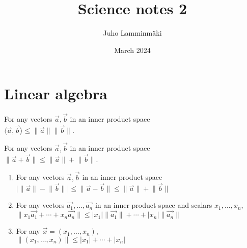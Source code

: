 \documentclass{article}
\title{Science notes 2}
\author{Juho Lamminmäki }
\date{March 2024}
\begin{document}
\maketitle

\section{Linear algebra}

\begin{theorem}
For any vectors $\vec{a}, \vec{b}$ in an inner product space \\
\begin{math}
\langle \vec{a}, \vec{b} \rangle \leq \lVert \vec{a} \rVert \lVert \vec{b} \rVert.
\end{math}
\end{theorem}

\begin{theorem}
For any vectors $\vec{a}, \vec{b}$ in an inner product space \\
\begin{math}
\lVert \vec{a} + \vec{b} \rVert \leq  \lVert \vec{a} \rVert + \lVert \vec{b} \rVert.
\end{math}
\end{theorem}
\begin{corollary}
    \begin{enumerate}
        \item For any vectors $\vec{a}, \vec{b}$ in an inner product space \\
        \begin{math}
        \lvert \lVert \vec{a} \rVert - \lVert \vec{b} \rVert \rvert \leq \lVert \vec{a} - \vec{b} \rVert \leq \lVert \vec{a} \rVert + \lVert \vec{b} \rVert
        \end{math}
        \item For any vectors $\vec{a_1}, \ldots, \vec{a_n}$ in an inner product space and scalars $x_1, \ldots, x_n$, \\
        \begin{math}
            \|x_1\vec{a_1} + \cdots + x_n\vec{a_n}\| \leq |x_1| \|\vec{a_1}\| + \cdots + |x_n|\|\vec{a_n}\|
        \end{math}
        \item For any $\vec{x} = (x_1, \ldots, x_n)$, \\
        \begin{math}
            \|(x_1, \ldots, x_n)\| \leq |x_1| + \cdots + |x_n|
        \end{math}
    
    
    \end{enumerate}
    \end{corollary}
\end{document}
